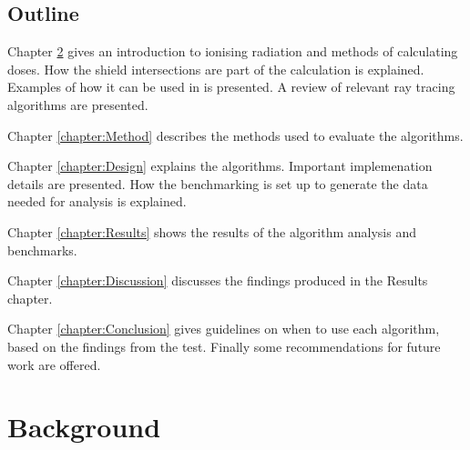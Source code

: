 \documentclass[11pt,twoside,a4paper]{report}
\begin{document}
\section{Outline}
Chapter \ref{chapter:Background} gives an introduction to ionising radiation and methods of calculating doses. How the shield intersections are part of the calculation is explained. Examples of how it can be used in is presented.   A review of relevant ray tracing algorithms are presented.

Chapter \ref{chapter:Method} describes the methods used to evaluate the algorithms.

Chapter \ref{chapter:Design} explains the algorithms. Important implemenation details are presented. How the benchmarking is set up to generate the data needed for analysis is explained.

Chapter \ref{chapter:Results} shows the results of the algorithm analysis and benchmarks.

Chapter \ref{chapter:Discussion} discusses the findings produced in the Results chapter.

Chapter \ref{chapter:Conclusion} gives guidelines on when to use each algorithm, based on the findings from the test. Finally some recommendations for future work are offered.


\chapter{Background}
\label{chapter:Background}

\end{document}
